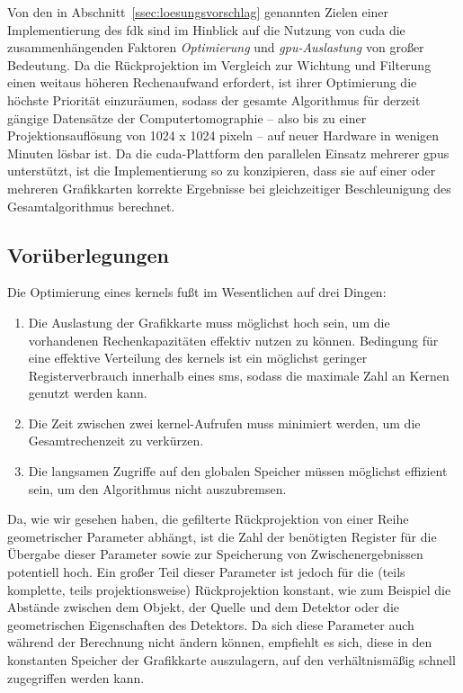 Von den in Abschnitt~\ref{ssec:loesungsvorschlag} genannten Zielen einer Implementierung des \gls{fdk} sind im Hinblick
auf die Nutzung von \gls{cuda} die zusammenhängenden Faktoren \textit{Optimierung} und \textit{\gls{gpu}-Auslastung}
von großer Bedeutung. Da die Rückprojektion im Vergleich zur Wichtung und Filterung einen weitaus höheren Rechenaufwand
erfordert, ist ihrer Optimierung die höchste Priorität einzuräumen, sodass der gesamte Algorithmus für derzeit gängige
Datensätze der Computertomographie -- also bis zu einer Projektionsauflösung von 1024 x 1024 \gls{pixel}n -- auf neuer
Hardware in wenigen Minuten lösbar ist. Da die \gls{cuda}-Plattform den parallelen Einsatz mehrerer \gls{gpu}s
unterstützt, ist die Implementierung so zu konzipieren, dass sie auf einer oder mehreren Grafikkarten korrekte
Ergebnisse bei gleichzeitiger Beschleunigung des Gesamtalgorithmus berechnet.

\subsection{Vorüberlegungen}\label{ssec:opti_ueber}

Die Optimierung eines \gls{kernel}s fußt im Wesentlichen auf drei Dingen:

\begin{enumerate}
    \item Die Auslastung der Grafikkarte muss möglichst hoch sein, um die vorhandenen Rechenkapazitäten effektiv nutzen
          zu können. Bedingung für eine effektive Verteilung des \gls{kernel}s ist ein möglichst geringer
          Registerverbrauch innerhalb eines \gls{sm}s, sodass die maximale Zahl an Kernen genutzt werden kann.
    \item Die Zeit zwischen zwei \gls{kernel}-Aufrufen muss minimiert werden, um die Gesamtrechenzeit zu verkürzen.
    \item Die langsamen Zugriffe auf den globalen Speicher müssen möglichst effizient sein, um den Algorithmus nicht
          auszubremsen.
\end{enumerate}

Da, wie wir gesehen haben, die gefilterte Rückprojektion von einer Reihe geometrischer Parameter abhängt, ist die Zahl
der benötigten Register für die Übergabe dieser Parameter sowie zur Speicherung von Zwischenergebnissen potentiell hoch.
Ein großer Teil dieser Parameter ist jedoch für die (teils komplette, teils projektionsweise) Rückprojektion konstant,
wie zum Beispiel die Abstände zwischen dem Objekt, der Quelle und dem Detektor oder die geometrischen Eigenschaften
des Detektors. Da sich diese Parameter auch während der Berechnung nicht ändern können, empfiehlt es sich, diese in
den konstanten Speicher der Grafikkarte auszulagern, auf den verhältnismäßig schnell zugegriffen werden kann.

